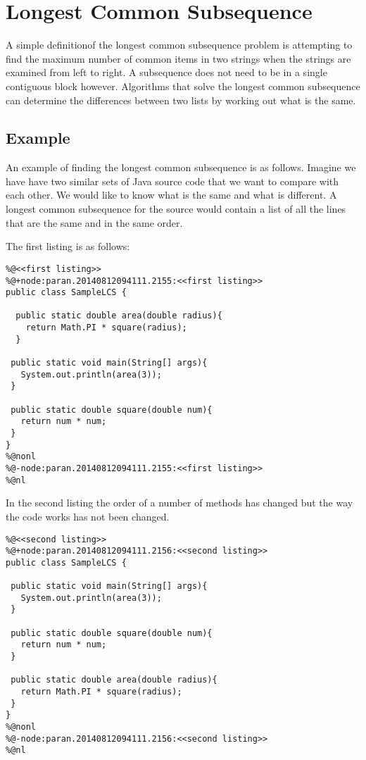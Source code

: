 \section{Longest Common Subsequence}
A simple definitionof the longest common subsequence problem is attempting to find the maximum number of common items in two strings when the strings are examined from left to right. A subsequence does not need to be in a single contiguous block however. Algorithms that solve the longest common subsequence can determine the differences between two lists by working out what is the same.   


\subsection{Example}
An example of finding the longest common subsequence is as follows.
Imagine we have have two similar sets of Java source code that we want to compare with each other.  
We would like to know what is the same and what is different.
A longest common subsequence for the source would contain a list of all the lines that are the same and in the same order.

The first listing is as follows:

\begin{lstlisting}
%@<<first listing>>
%@+node:paran.20140812094111.2155:<<first listing>>
public class SampleLCS { 

  public static double area(double radius){
    return Math.PI * square(radius);
  }
  
 public static void main(String[] args){
   System.out.println(area(3));
 }
 
 public static double square(double num){
   return num * num;
 }
}
%@nonl
%@-node:paran.20140812094111.2155:<<first listing>>
%@nl
\end{lstlisting}

In the second listing the order of a number of methods has changed but the way the code works has not been changed.

\begin{lstlisting}
%@<<second listing>>
%@+node:paran.20140812094111.2156:<<second listing>>
public class SampleLCS {

 public static void main(String[] args){
   System.out.println(area(3));
 }
 
 public static double square(double num){
   return num * num;
 }
 
 public static double area(double radius){
   return Math.PI * square(radius);
 }
}
%@nonl
%@-node:paran.20140812094111.2156:<<second listing>>
%@nl
\end{lstlisting}

